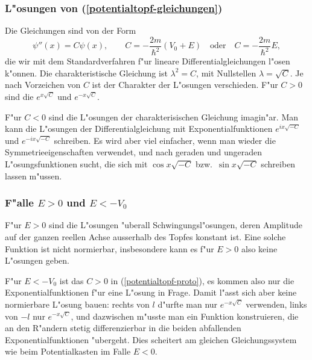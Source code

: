 \subsubsection{L"osungen von (\ref{potentialtopf-gleichungen})}
Die Gleichungen sind von der Form
\begin{equation}
\psi''(x)=C\psi(x),\qquad
C=-\frac{2m}{\hbar^2}(V_0+E)
\quad
\text{oder}
\quad
C=-\frac{2m}{\hbar^2}E,
\label{potentialtopf-proto}
\end{equation}
die wir mit dem Standardverfahren f"ur lineare Differentialgleichungen
l"osen k"onnen.
Die charakteristische  Gleichung ist $\lambda^2=C$, mit Nullstellen
$\lambda=\sqrt{C}$. Je nach Vorzeichen von $C$ ist der Charakter der
L"osungen verschieden.
F"ur $C>0$ sind die $e^{x\sqrt{C}}$ und $e^{-x\sqrt{C}}$.

F"ur $C<0$ sind die L"osungen der charakterisischen Gleichung imagin"ar.
Man kann die L"osungen der Differentialgleichung mit Exponentialfunktionen
$e^{ix\sqrt{-C}}$ und $e^{-ix\sqrt{-C}}$ schreiben.
Es wird aber viel einfacher, wenn man wieder die Symmetrieeigenschaften
verwendet, und nach geraden und ungeraden L"osungsfunktionen sucht,
die sich mit $\cos x\sqrt{-C}$ bzw.~$\sin x\sqrt{-C}$ schreiben
lassen m"ussen.

\subsubsection{F"alle $E>0$ und $E<-V_0$}
F"ur $E>0$ sind die L"osungen "uberall Schwingungsl"osungen, deren
Amplitude auf der ganzen reellen Achse ausserhalb des Topfes
konstant ist. Eine solche Funktion ist nicht normierbar, insbesondere
kann es f"ur $E>0$ also keine L"osungen geben.

F"ur $E<-V_0$ ist das $C>0$ in (\ref{potentialtopf-proto}), es kommen
also nur die Exponentialfunktionen f"ur eine L"osung in Frage.
Damit l"asst sich aber keine normierbare L"osung bauen: rechts von $l$
d"urfte man nur $e^{-x\sqrt{C}}$ verwenden, links von $-l$ nur
$e^{-x\sqrt{C}}$, und dazwischen m"usste man ein Funktion konstruieren,
die an den R"andern stetig differenzierbar in die beiden abfallenden
Exponentialfunktionen "ubergeht.
Dies scheitert am gleichen Gleichungssystem wie beim Potentialkasten
im Falle $E<0$.

